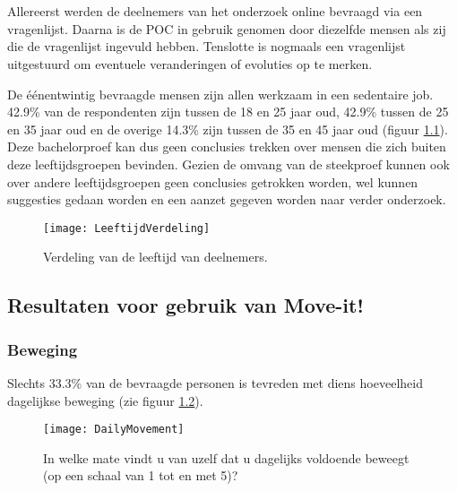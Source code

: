\chapter{}%
\label{ch:analyse}

Allereerst werden de deelnemers van het onderzoek online bevraagd via een vragenlijst. Daarna is de POC in gebruik genomen door diezelfde mensen als zij die de vragenlijst ingevuld hebben. Tenslotte is nogmaals een vragenlijst uitgestuurd om eventuele veranderingen of evoluties op te merken.

De éénentwintig bevraagde mensen zijn allen werkzaam in een sedentaire job. 42.9\% van de respondenten zijn tussen de 18 en 25 jaar oud, 42.9\% tussen de 25 en 35 jaar oud en de overige 14.3\% zijn tussen de 35 en 45 jaar oud (figuur \ref{fig:leeftijd}). Deze bachelorproef kan dus geen conclusies trekken over mensen die zich buiten deze leeftijdsgroepen bevinden. Gezien de omvang van de steekproef kunnen ook over andere leeftijdsgroepen geen conclusies getrokken worden, wel kunnen suggesties gedaan worden en een aanzet gegeven worden naar verder onderzoek.

\begin{figure}[h]
    \caption[Verdeling van de leeftijd van deelnemers.]{Verdeling van de leeftijd van deelnemers.}
    \texttt{[image: LeeftijdVerdeling]}
    \label{fig:leeftijd}
\end{figure}

\section{Resultaten voor gebruik van Move-it!}

\subsection{Beweging}
Slechts 33.3\% van de bevraagde personen is tevreden met diens hoeveelheid dagelijkse beweging (zie figuur \ref{fig:dagelijkseBeweging}).

\begin{figure}[h]
    \caption[In welke mate vindt u van uzelf dat u dagelijks voldoende beweegt?]{In welke mate vindt u van uzelf dat u dagelijks voldoende beweegt (op een schaal van 1 tot en met 5)?}
    \texttt{[image: DailyMovement]}
    \label{fig:dagelijkseBeweging}
\end{figure}

